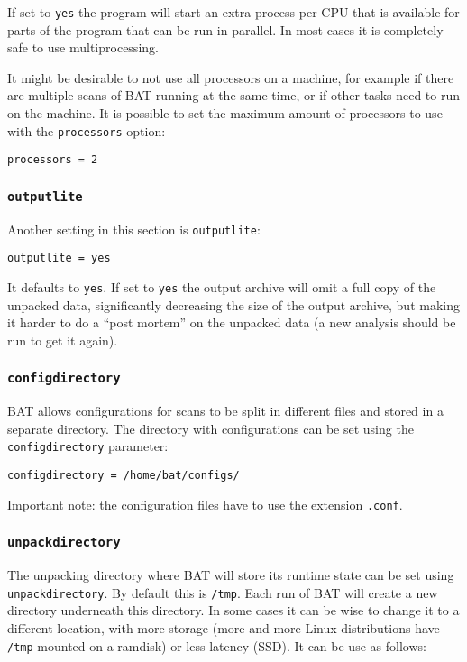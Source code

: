 \documentclass[10pt,a4paper]{article}
\begin{document}
If set to \texttt{yes} the program will start an extra process per CPU that is
available for parts of the program that can be run in parallel. In most cases
it is completely safe to use multiprocessing.

It might be desirable to not use all processors on a machine, for example if
there are multiple scans of BAT running at the same time, or if other tasks
need to run on the machine. It is possible to set the maximum amount of
processors to use with the \texttt{processors} option:

\begin{verbatim}
processors = 2
\end{verbatim}

\subsubsection{\texttt{outputlite}}

Another setting in this section is \texttt{outputlite}:

\begin{verbatim}
outputlite = yes
\end{verbatim}

It defaults to \texttt{yes}. If set to \texttt{yes} the output archive will omit
a full copy of the unpacked data, significantly decreasing the size of the
output archive, but making it harder to do a ``post mortem'' on the unpacked
data (a new analysis should be run to get it again).

\subsubsection{\texttt{configdirectory}}

BAT allows configurations for scans to be split in different files and stored
in a separate directory. The directory with configurations can be set using the
\texttt{configdirectory} parameter:

\begin{verbatim}
configdirectory = /home/bat/configs/
\end{verbatim}

Important note: the configuration files have to use the extension
\texttt{.conf}.

\subsubsection{\texttt{unpackdirectory}}

The unpacking directory where BAT will store its runtime state can be set using
\texttt{unpackdirectory}. By default this is \texttt{/tmp}. Each run of BAT
will create a new directory underneath this directory. In some cases it can be
wise to change it to a different location, with more storage (more and more
Linux distributions have \texttt{/tmp} mounted on a ramdisk) or less latency
(SSD). It can be use as follows:
\end{document}
